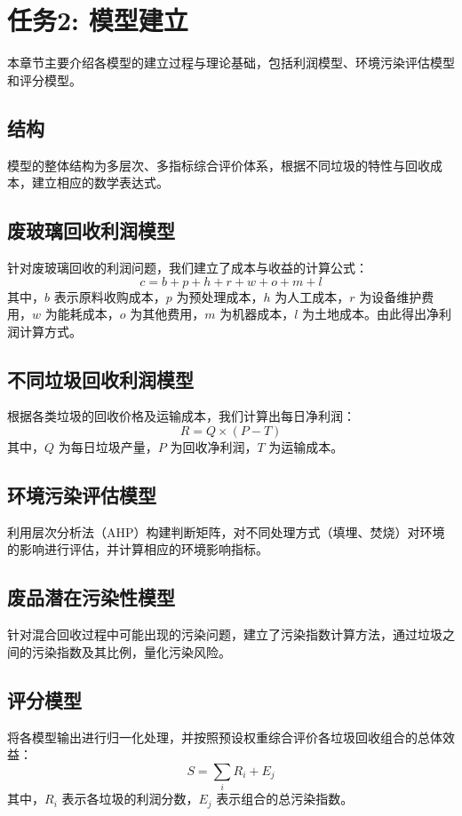\documentclass[11pt,a4paper]{ctexart} %
\begin{document}
\section{任务2: 模型建立}
本章节主要介绍各模型的建立过程与理论基础，包括利润模型、环境污染评估模型和评分模型。

\subsection{结构}
模型的整体结构为多层次、多指标综合评价体系，根据不同垃圾的特性与回收成本，建立相应的数学表达式。

\subsection{废玻璃回收利润模型}
针对废玻璃回收的利润问题，我们建立了成本与收益的计算公式：
\[
c = b + p + h + r + w + o + m + l
\]
其中，\(b\) 表示原料收购成本，\(p\) 为预处理成本，\(h\) 为人工成本，\(r\) 为设备维护费用，\(w\) 为能耗成本，\(o\) 为其他费用，\(m\) 为机器成本，\(l\) 为土地成本。由此得出净利润计算方式。

\subsection{不同垃圾回收利润模型}
根据各类垃圾的回收价格及运输成本，我们计算出每日净利润：
\[
R = Q \times (P - T)
\]
其中，\(Q\) 为每日垃圾产量，\(P\) 为回收净利润，\(T\) 为运输成本。

\subsection{环境污染评估模型}
利用层次分析法（AHP）构建判断矩阵，对不同处理方式（填埋、焚烧）对环境的影响进行评估，并计算相应的环境影响指标。

\subsection{废品潜在污染性模型}
针对混合回收过程中可能出现的污染问题，建立了污染指数计算方法，通过垃圾之间的污染指数及其比例，量化污染风险。

\subsection{评分模型}
将各模型输出进行归一化处理，并按照预设权重综合评价各垃圾回收组合的总体效益：
\[
S = \sum_{i} R_i + E_j
\]
其中，\(R_i\) 表示各垃圾的利润分数，\(E_j\) 表示组合的总污染指数。
\end{document}
